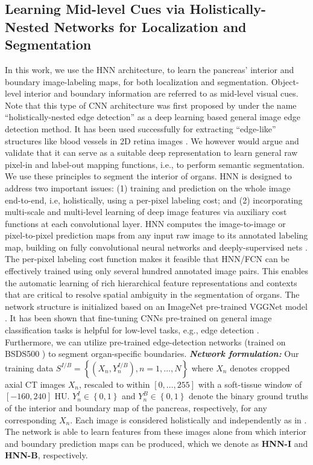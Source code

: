 \documentclass[journal]{IEEEtran}
\begin{document}
\subsection{Learning Mid-level Cues via Holistically-Nested Networks for Localization and Segmentation} \label{sec:segHNN} 
\noindent In this work, we use the HNN architecture, to learn the pancreas' interior and boundary image-labeling maps, for both localization and segmentation. Object-level interior and boundary information are referred to as mid-level visual cues. Note that this type of CNN architecture was first proposed by \cite{xie2015holistically} under the name ``holistically-nested edge detection'' as a deep learning based general image edge detection method. It has been used successfully for extracting ``edge-like'' structures like blood vessels in 2D retina images \cite{fu2016retinal}. We however would argue and validate that it can serve as a suitable deep representation to learn general raw pixel-in and label-out mapping functions, i.e., to perform semantic segmentation. We use these principles to segment the interior of organs. 
HNN is designed to address two important issues: (1) training and prediction on the whole image end-to-end, i.e, holistically, using a per-pixel labeling cost; and (2) incorporating multi-scale and multi-level learning of deep image features \cite{xie2015holistically} via auxiliary cost functions at each convolutional layer. HNN computes the image-to-image or pixel-to-pixel prediction maps from any input raw image to its annotated labeling map, building on fully convolutional neural networks \cite{long2015fully} and deeply-supervised nets \cite{lee2014deeply}. The per-pixel labeling cost function \cite{long2015fully,xie2015holistically} makes it feasible that HNN/FCN can be effectively trained using only several hundred annotated image pairs. This enables the automatic learning of rich hierarchical feature representations and contexts that are critical to resolve spatial ambiguity in the segmentation of organs. The network structure is initialized based on an ImageNet pre-trained VGGNet model \cite{simonyan2014very}. It has been shown that fine-tuning CNNs pre-trained on general image classification tasks is helpful for low-level tasks, e.g., edge detection \cite{xie2015holistically}. Furthermore, we can utilize pre-trained edge-detection networks (trained on BSDS500 \cite{xie2015holistically}) to segment organ-specific boundaries.
\textbf{\textit{Network formulation:}} Our training data $S^{I/B} = \left\{(X_n , Y^{I/B}_n ), n = 1, \dots, N \right\}$ where $X_n$ denotes cropped axial CT images $X_n$, rescaled to within $\left[0,\dots,255\right]$ with a soft-tissue window of $[-160, 240]$ HU. $Y^I_n \in \left\{0,1\right\}$ and $Y^B_n \in \left\{0,1\right\}$ denote the binary ground truths of the interior and boundary map of the pancreas, respectively, for any corresponding $X_n$. Each image is considered holistically and independently as in \cite{xie2015holistically}. The network is able to learn features from these images alone from which interior  and boundary prediction maps can be produced, which we denote as \textbf{HNN-I} and \textbf{HNN-B}, respectively.
\end{document}
